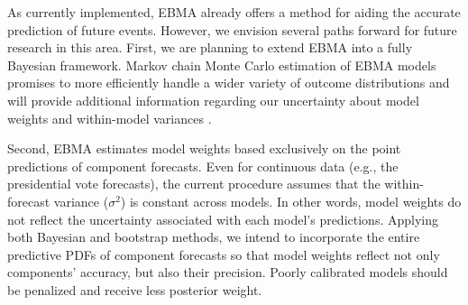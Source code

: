 \documentclass[12pt,fullpage,endnotes]{article}
\begin{document}
As currently implemented, EBMA already offers a method for aiding the
accurate prediction of future events.  However, we envision several
paths forward for future research in this area. First, we are planning
to extend EBMA into a fully Bayesian framework. Markov chain Monte
Carlo estimation of EBMA models promises to more efficiently handle a
wider variety of outcome distributions and will provide additional
information regarding our uncertainty about model weights and
within-model variances \citep{Vrugt:2008}.

Second, EBMA estimates model weights based exclusively on the point
predictions of component forecasts.  Even for continuous data (e.g.,
the presidential vote forecasts), the current procedure assumes that
the within-forecast variance ($\sigma^2$) is constant across models.
In other words, model weights do not reflect the uncertainty
associated with each model's predictions.  Applying both Bayesian and
bootstrap methods, we intend to incorporate the entire predictive PDFs
of component forecasts so that model weights reflect not only
components' accuracy, but also their precision.  Poorly calibrated
models should be penalized and receive less posterior weight.

\end{document}
